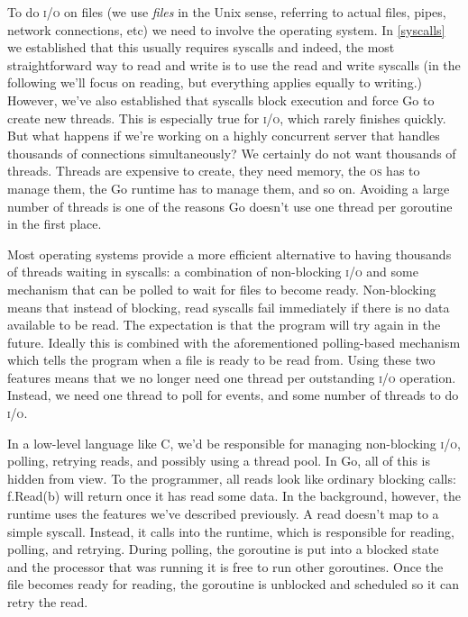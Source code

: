 \documentclass[10pt,letterpaper,oneside,openany,english]{memoir}
\newcommand{\code}[1]{{\ttfamily\mbox{#1}}}
\begin{document}
To do \textsc{i/o} on files (we use \emph{files} in the Unix sense, referring to actual files, pipes, network connections, etc) we need to involve the operating system.
In \cref{syscalls} we established that this usually requires syscalls and indeed, the most straightforward way to read and write is to use the \code{read} and \code{write} syscalls (in the following we'll focus on reading, but everything applies equally to writing.)
However, we've also established that syscalls block execution and force Go to create new threads.
This is especially true for \textsc{i/o}, which rarely finishes quickly.
But what happens if we're working on a highly concurrent server that handles thousands of connections simultaneously?
We certainly do not want thousands of threads.
Threads are expensive to create, they need memory, the \textsc{os} has to manage them, the Go runtime has to manage them, and so on.
Avoiding a large number of threads is one of the reasons Go doesn't use one thread per goroutine in the first place.

Most operating systems provide a more efficient alternative to having thousands of threads waiting in syscalls:
a combination of non-blocking \textsc{i/o} and some mechanism that can be polled to wait for files to become ready.
Non-blocking means that instead of blocking, read syscalls fail immediately if there is no data available to be read.
The expectation is that the program will try again in the future.
Ideally this is combined with the aforementioned polling-based mechanism which tells the program when a file is ready to be read from.
Using these two features means that we no longer need one thread per outstanding \textsc{i/o} operation. Instead, we need one thread to poll for events, and some number of threads to do \textsc{i/o}.

In a low-level language like C, we'd be responsible for managing non-blocking \textsc{i/o}, polling, retrying reads, and possibly using a thread pool.
In Go, all of this is hidden from view. To the programmer, all reads look like ordinary blocking calls: \code{f.Read(b)} will return once it has read some data.
In the background, however, the runtime uses the features we've described previously.
A read doesn't map to a simple syscall. Instead, it calls into the runtime, which is responsible for reading, polling, and retrying.
During polling, the goroutine is put into a blocked state and the processor that was running it is free to run other goroutines.
Once the file becomes ready for reading, the goroutine is unblocked and scheduled so it can retry the read.
\end{document}
